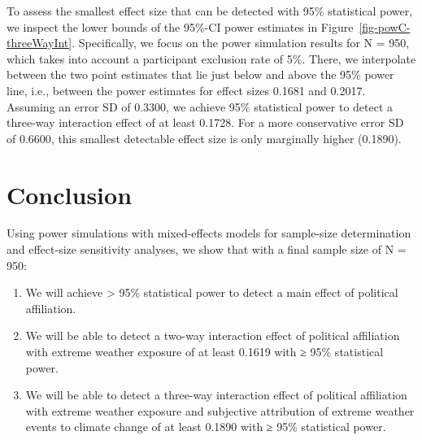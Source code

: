 \documentclass[
  letterpaper,
  DIV=11,
  numbers=noendperiod]{scrartcl}
\begin{document}
To assess the smallest effect size that can be detected with 95\%
statistical power, we inspect the lower bounds of the 95\%-CI power
estimates in Figure~\ref{fig-powC-threeWayInt}. Specifically, we focus
on the power simulation results for N = 950, which takes into account a
participant exclusion rate of 5\%. There, we interpolate between the two
point estimates that lie just below and above the 95\% power line, i.e.,
between the power estimates for effect sizes 0.1681 and 0.2017. Assuming
an error SD of 0.3300, we achieve 95\% statistical power to detect a
three-way interaction effect of at least 0.1728. For a more conservative
error SD of 0.6600, this smallest detectable effect size is only
marginally higher (0.1890).

\section{Conclusion}\label{conclusion}

Using power simulations with mixed-effects models for sample-size
determination and effect-size sensitivity analyses, we show that with a
final sample size of N = 950:

\begin{enumerate}
\def\labelenumi{\arabic{enumi}.}
\item
  We will achieve \textgreater{} 95\% statistical power to detect a main
  effect of political affiliation.
\item
  We will be able to detect a two-way interaction effect of political
  affiliation with extreme weather exposure of at least 0.1619 with ≥
  95\% statistical power.
\item
  We will be able to detect a three-way interaction effect of political
  affiliation with extreme weather exposure and subjective attribution
  of extreme weather events to climate change of at least 0.1890 with ≥
  95\% statistical power.
\end{enumerate}
\end{document}
